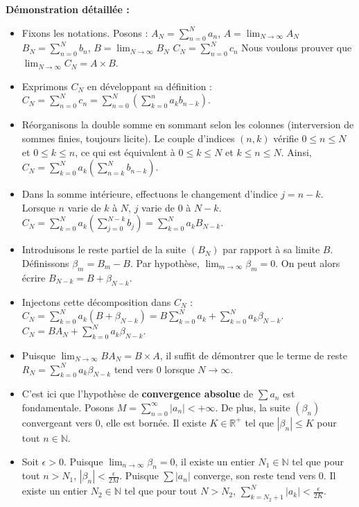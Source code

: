\documentclass[12pt,a4paper]{report}
\begin{document}
\textbf{Démonstration détaillée  :}
\begin{itemize}
\item Fixons les notations. Posons :
   $A_N = \sum_{n=0}^N a_n$, $A = \lim_{N\to\infty} A_N$
   $B_N = \sum_{n=0}^N b_n$, $B = \lim_{N\to\infty} B_N$
   $C_N = \sum_{n=0}^N c_n$
   Nous voulons prouver que $\lim_{N\to\infty} C_N = A \times B$.
\item Exprimons $C_N$ en développant sa définition :
   $C_N = \sum_{n=0}^N c_n = \sum_{n=0}^N \left( \sum_{k=0}^n a_k b_{n-k} \right)$.
\item Réorganisons la double somme en sommant selon les colonnes (interversion de sommes finies, toujours licite). Le couple d'indices $(n, k)$ vérifie $0 \le n \le N$ et $0 \le k \le n$, ce qui est équivalent à $0 \le k \le N$ et $k \le n \le N$.
   Ainsi, $C_N = \sum_{k=0}^N a_k \left( \sum_{n=k}^N b_{n-k} \right)$.
\item Dans la somme intérieure, effectuons le changement d'indice $j = n-k$. Lorsque $n$ varie de $k$ à $N$, $j$ varie de $0$ à $N-k$.
   $C_N = \sum_{k=0}^N a_k \left( \sum_{j=0}^{N-k} b_j \right) = \sum_{k=0}^N a_k B_{N-k}$.
\item Introduisons le reste partiel de la suite $(B_N)$ par rapport à sa limite $B$. Définissons $\beta_m = B_m - B$. Par hypothèse, $\lim_{m\to\infty} \beta_m = 0$. On peut alors écrire $B_{N-k} = B + \beta_{N-k}$.
\item Injectons cette décomposition dans $C_N$ :
   $C_N = \sum_{k=0}^N a_k (B + \beta_{N-k}) = B \sum_{k=0}^N a_k + \sum_{k=0}^N a_k \beta_{N-k}$.
   $C_N = B A_N + \sum_{k=0}^N a_k \beta_{N-k}$.
\item Puisque $\lim_{N\to\infty} B A_N = B \times A$, il suffit de démontrer que le terme de reste $R_N = \sum_{k=0}^N a_k \beta_{N-k}$ tend vers $0$ lorsque $N \to \infty$.
\item C'est ici que l'hypothèse de \textbf{convergence absolue} de $\sum a_n$ est fondamentale. Posons $M = \sum_{n=0}^\infty |a_n| < +\infty$.
   De plus, la suite $(\beta_n)$ convergeant vers $0$, elle est bornée. Il existe $K \in \mathbb{R}^+$ tel que $|\beta_n| \le K$ pour tout $n \in \mathbb{N}$.
\item Soit $\epsilon > 0$. Puisque $\lim_{n\to\infty} \beta_n = 0$, il existe un entier $N_1 \in \mathbb{N}$ tel que pour tout $n > N_1$, $|\beta_n| < \frac{\epsilon}{2M}$.
   Puisque $\sum |a_n|$ converge, son reste tend vers $0$. Il existe un entier $N_2 \in \mathbb{N}$ tel que pour tout $N > N_2$, $\sum_{k=N_2+1}^N |a_k| < \frac{\epsilon}{2K}$.

\end{itemize}
\end{document}
